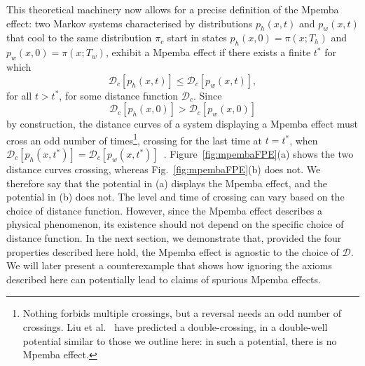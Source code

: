 \documentclass[hyperref={colorlinks=true, urlcolor=blue, citecolor=blue, final, bound}]{sfuthesis}
\begin{document}
This theoretical machinery now allows for a precise definition of the Mpemba effect: two Markov systems characterised by distributions $p_h(x,t)$ and $p_w(x,t)$ that cool to the same distribution $\pi_c$ start in states $p_h(x,0) = \pi(x;T_h)$ and $p_w(x,0)=\pi(x;T_w)$, exhibit a Mpemba effect if there exists a finite $t^*$ for which 
\begin{equation}
    \mathcal D_c[p_h(x,t)] \leq \mathcal D_c[p_w(x,t)],\label{eq:mpembaCondition}
\end{equation}
for all $t>t^*$, for some distance function $\mathcal D_c$. Since 
\begin{equation}
    \mathcal D_c[p_h(x,0)] > \mathcal D_c[p_w(x,0)]
\end{equation}
by construction, the distance curves of a system displaying a Mpemba effect must cross an odd number of times\footnote{Nothing forbids multiple crossings, but a reversal needs an odd number of crossings. Liu et al.~\cite{Liu2026} have predicted a double-crossing, in a double-well potential similar to those we outline here: in such a potential, there is no Mpemba effect.}, crossing for the last time at $t=t^*$, when $\mathcal D_c[p_h(x,t^*)]=\mathcal D_c[p_w(x,t^*)]$~\cite{Klich2019}. Figure~\ref{fig:mpembaFPE}(a) shows the two distance curves crossing, whereas Fig.~\ref{fig:mpembaFPE}(b) does not. We therefore say that the potential in (a) displays the Mpemba effect, and the potential in (b) does not. The level and time of crossing can vary based on the choice of distance function. However, since the Mpemba effect describes a physical phenomenon, its existence should not depend on the specific choice of distance function. In the next section, we demonstrate that, provided the four properties described here hold, the Mpemba effect is agnostic to the choice of $\mathscr D$. We will later present a counterexample that shows how ignoring the axioms described here can potentially lead to claims of spurious Mpemba effects.
\end{document}
